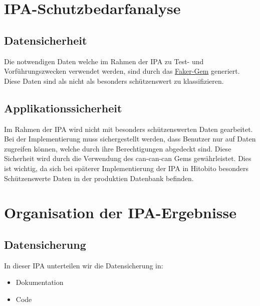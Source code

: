 \chapter{IPA-Schutzbedarfanalyse}

\section{Datensicherheit}
Die notwendigen Daten welche im Rahmen der IPA zu Test- und Vorführungszwecken verwendet werden,
sind durch das \href{https://github.com/faker-ruby/faker}{Faker-Gem} generiert. Diese Daten sind als nicht als besonders 
schützenswert zu klassifizieren.

\section{Applikationssicherheit}
Im Rahmen der IPA wird nicht mit besonders schützenswerten Daten gearbeitet. Bei der Implementierung muss sichergestellt werden, dass
Benutzer nur auf Daten zugreifen können, welche durch ihre Berechtigungen abgedeckt sind. Diese Sicherheit wird durch die Verwendung
des can-can-can Gems gewährleistet. Dies ist wichtig, da sich bei späterer Implementierung der IPA in 
Hitobito besonders Schützenswerte Daten in der produktien Datenbank befinden.

\chapter{Organisation der IPA-Ergebnisse}
\section{Datensicherung}
In dieser IPA unterteilen wir die Datensicherung in:

\begin{itemize}
\item Dokumentation
\item Code
\end{itemize}

